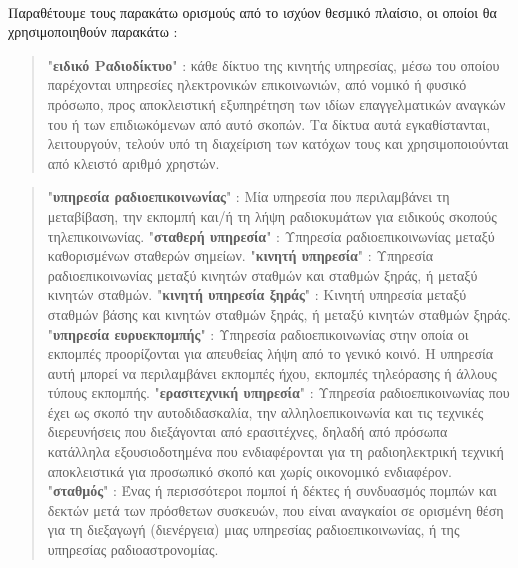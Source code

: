\documentclass[a4paper, 12pt, twoside]{report}
\begin{document}
{{{{{{			\paragraph{}{Παραθέτουμε τους παρακάτω ορισμούς από το ισχύον θεσμικό πλαίσιο, οι οποίοι θα χρησιμοποιηθούν παρακάτω :
			\begin{quote}
				"\textbf{ειδικό Ραδιοδίκτυο}" : κάθε δίκτυο της κινητής υπηρεσίας, μέσω του οποίου παρέχονται υπηρεσίες ηλεκτρονικών επικοινωνιών, από νομικό ή φυσικό πρόσωπο, προς αποκλειστική εξυπηρέτηση των ιδίων επαγγελματικών αναγκών του ή των επιδιωκόμενων από αυτό σκοπών. Τα δίκτυα αυτά εγκαθίστανται, λειτουργούν, τελούν υπό τη διαχείριση των κατόχων τους και χρησιμοποιούνται από κλειστό αριθμό χρηστών. \cite[Κεφάλαιο Α, Άρθρο 2 Ορισμοί]{ΦΕΚ2006A13}
			\end{quote}
			\begin{quote}
				"\textbf{υπηρεσία ραδιοεπικοινωνίας}" : Μία υπηρεσία που περιλαμβάνει τη μεταβίβαση, την εκπομπή και/ή τη λήψη ραδιοκυμάτων για ειδικούς σκοπούς τηλεπικοινωνίας.\linebreak
				"\textbf{σταθερή υπηρεσία}" : Υπηρεσία ραδιοεπικοινωνίας μεταξύ καθορισμένων σταθερών σημείων.\linebreak
				"\textbf{κινητή υπηρεσία}" : Υπηρεσία ραδιοεπικοινωνίας μεταξύ κινητών σταθμών και σταθμών ξηράς, ή μεταξύ κινητών σταθμών.\linebreak
				"\textbf{κινητή υπηρεσία ξηράς}" : Κινητή υπηρεσία μεταξύ σταθμών βάσης και κινητών σταθμών ξηράς, ή μεταξύ κινητών σταθμών ξηράς.\linebreak
				"\textbf{υπηρεσία ευρυεκπομπής}" : Υπηρεσία ραδιοεπικοινωνίας στην οποία οι εκπομπές προορίζονται για απευθείας λήψη από το γενικό κοινό. Η υπηρεσία αυτή μπορεί να περιλαμβάνει εκπομπές ήχου, εκπομπές τηλεόρασης ή άλλους τύπους εκπομπής.\linebreak
				"\textbf{ερασιτεχνική υπηρεσία}" : Υπηρεσία ραδιοεπικοινωνίας που έχει ως σκοπό την αυτοδιδασκαλία, την αλληλοεπικοινωνία και τις τεχνικές διερευνήσεις που διεξάγονται από ερασιτέχνες, δηλαδή από πρόσωπα κατάλληλα εξουσιοδοτημένα που ενδιαφέρονται για τη ραδιοηλεκτρική τεχνική αποκλειστικά για προσωπικό σκοπό και χωρίς οικονομικό ενδιαφέρον.\linebreak
				"\textbf{σταθμός}" : Ένας ή περισσότεροι πομποί ή δέκτες ή συνδυασμός πομπών και δεκτών μετά των πρόσθετων συσκευών, που είναι αναγκαίοι σε ορισμένη θέση για τη διεξαγωγή (διενέργεια) μιας υπηρεσίας ραδιοεπικοινωνίας, ή της υπηρεσίας ραδιοαστρονομίας.\linebreak

\end{quote}}}}}}}}
\end{document}
